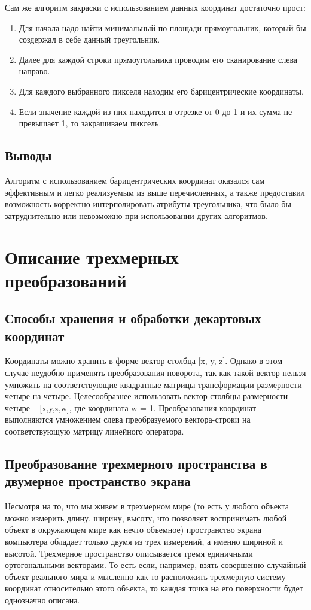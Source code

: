 \documentclass[12pt,a4paper,oneside]{report}
\begin{document}
	 Сам же алгоритм закраски с использованием данных координат достаточно прост:
	\begin{enumerate}
		\item Для начала надо найти минимальный по площади прямоугольник, который бы создержал в себе данный треугольник.
		\item Далее для каждой строки прямоугольника проводим его сканирование слева направо.
		\item Для каждого выбранного пикселя находим его барицентрические координаты.
		\item Если значение каждой из них находится в отрезке от 0 до 1 и их сумма не превышает 1, то закрашиваем пиксель.
	\end{enumerate}

	\subsection{Выводы}
	 \quad Алгоритм с использованием барицентрических координат оказался сам эффективным и легко реализуемым из выше перечисленных, а также предоставил возможность корректно интерполировать атрибуты треугольника, что было бы затруднительно или невозможно при использовании других алгоритмов.
	
	\section{Описание трехмерных преобразований}
	
	\subsection{Способы хранения и обработки декартовых координат}
	 \quad Координаты можно хранить в форме вектор-столбца [x, y, z]. Однако в этом случае неудобно применять преобразования поворота, так как такой вектор нельзя умножить на соответствующие квадратные матрицы трансформации размерности четыре на четыре. Целесообразнее использовать вектор-столбцы размерности четыре -- [x,y,z,w], где координата w = 1. Преобразования координат выполняются умножением слева преобразуемого вектора-строки на соответствующую матрицу линейного оператора.
	
	\subsection{Преобразование трехмерного пространства в двумерное пространство экрана}
	 \quad Несмотря на то, что мы живем в трехмерном мире (то есть у любого объекта можно измерить длину, ширину, высоту, что позволяет воспринимать любой объект в окружающем мире как нечто объемное) пространство экрана компьютера обладает только двумя из трех измерений, а именно шириной и высотой. Трехмерное пространство описывается тремя единичными ортогональными векторами. То есть если, например, взять совершенно случайный объект реального мира и мысленно как-то расположить трехмерную систему координат относительно этого объекта, то каждая точка на его поверхности будет однозначно описана. 
	
\end{document}
